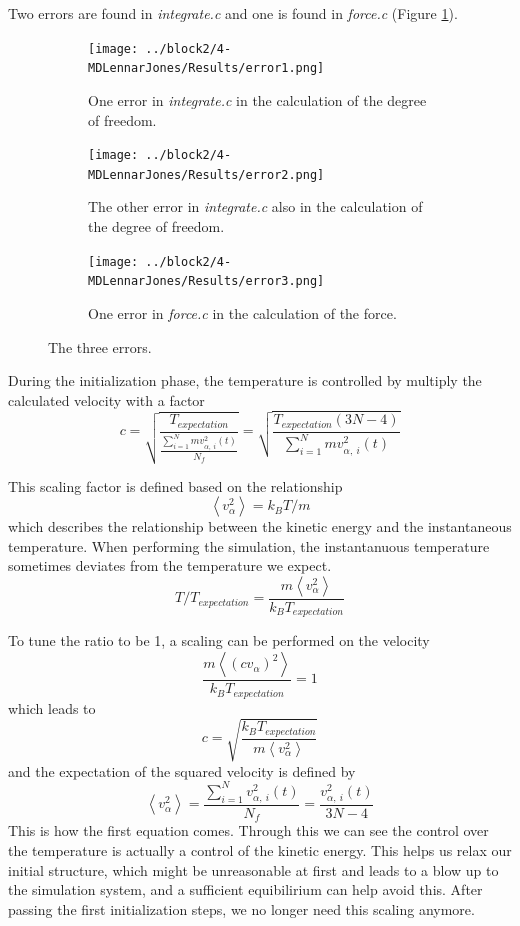 \documentclass{assignmeownt}
\begin{document}
Two errors are found in \textit{integrate.c} and one is found in \textit{force.c} (Figure \ref{fig:errors}).
\begin{figure}
    \centering
    \begin{subfigure}[b]{0.4\textwidth}
        \centering
        \texttt{[image: ../block2/4-MDLennarJones/Results/error1.png]}
        \caption{One error in \textit{integrate.c} in the calculation of the degree of freedom.}
    \end{subfigure}
    \begin{subfigure}[b]{0.4\textwidth}
        \centering
        \texttt{[image: ../block2/4-MDLennarJones/Results/error2.png]}
        \caption{The other error in \textit{integrate.c} also in the calculation of the degree of freedom.}
    \end{subfigure}
    \begin{subfigure}[b]{0.4\textwidth}
        \centering
        \texttt{[image: ../block2/4-MDLennarJones/Results/error3.png]}
        \caption{One error in \textit{force.c} in the calculation of the force.}
    \end{subfigure}
       \caption{The three errors.}
       \label{fig:errors}
  \end{figure}


During the initialization phase, the temperature is controlled by multiply the calculated velocity with a factor
$$ c = \sqrt{\frac{T_{expectation}}{\frac{\sum_{i=1}^N mv_{\alpha,\ i}^2(t)}{N_f}}}=\sqrt{\frac{T_{expectation}(3N-4)}{\sum_{i=1}^N mv_{\alpha,\ i}^2(t)}} $$

This scaling factor is defined based on the relationship
$$\left<v_\alpha^2\right>=k_BT/m$$
which describes the relationship between the kinetic energy and the instantaneous temperature. When performing the simulation, the instantanuous temperature sometimes deviates from the temperature we expect.
$$ T/T_{expectation}=\frac{m\left<v_\alpha^2\right>}{k_BT_{expectation}}$$

To tune the ratio to be 1, a scaling can be performed on the velocity
$$\frac{m\left<(cv_\alpha)^2\right>}{k_BT_{expectation}}=1$$
which leads to
$$c=\sqrt{\frac{k_BT_{expectation}}{m\left<v_\alpha^2\right>}}$$
and the expectation of the squared velocity is defined by
$$\left<v_\alpha^2\right>=\frac{\sum_{i=1}^{N}v_{\alpha,\ i}^2(t)}{N_f}=\frac{v_{\alpha,\ i}^2(t)}{3N-4}$$
This is how the first equation comes. Through this we can see the control over the temperature is actually a control of the kinetic energy. This helps us relax our initial structure, which might be unreasonable at first and leads to a blow up to the simulation system, and a sufficient equibilirium can help avoid this. After passing the first initialization steps, we no longer need this scaling anymore.
\end{document}
